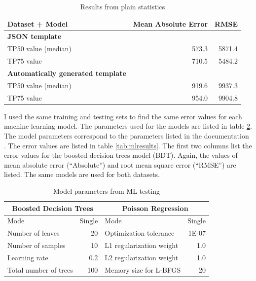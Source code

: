 \begin{table}[htb]
\begin{center}
\begin{tabularx}{\linewidth}{| X | r | r |}
\hline
Dataset + Model & Mean Absolute Error & RMSE \\
\hline
\textbf{JSON template} &  & \\
TP50 value (median)         & 573.3 & 5871.4 \\
TP75 value                  & 710.5 & 5484.2 \\
\hline
\textbf{Automatically generated template} &  & \\
TP50 value (median)         & 919.6 & 9937.3 \\
TP75 value                  & 954.0 & 9904.8 \\
\hline
\end{tabularx}
\end{center}
\caption{Results from plain statistics}
\label{tab:statresults}
\end{table}

I used the same training and testing sets to find the same error values for each machine learning model.
The parameters used for the models are listed in table \ref{tab:modelparameters}.
The model parameters correspond to the parameters listed in the documentation \cite{azurebdt,azurepoisson}.
The error values are listed in table \ref{tab:mlresults}.
The first two columns list the error values for the boosted decision trees model (BDT).
Again, the values of mean absolute error (``Absolute'') and root mean square error (``RMSE'') are listed.
The same models are used for both datasets.

\begin{table}[htb]
\begin{center}
\begin{tabular}{| l  r | l  r |}
\hline
\multicolumn{2}{|c|}{Boosted Decision Trees} & \multicolumn{2}{|c|}{Poisson Regression} \\
\hline
Mode & Single         & Mode & Single \\
Number of leaves & 20   & Optimization tolerance & 1E-07 \\
Number of samples & 10  & L1 regularization weight & 1.0 \\
Learning rate & 0.2             & L2 regularization weight & 1.0 \\
Total number of trees & 100     & Memory size for L-BFGS & 20 \\
\hline
\end{tabular}
\end{center}
\caption{Model parameters from ML testing}
\label{tab:modelparameters}
\end{table}

